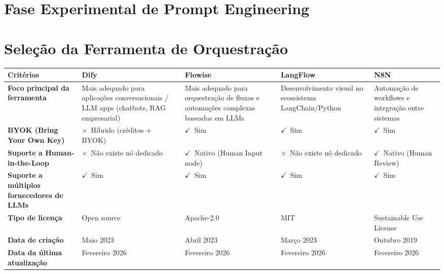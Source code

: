 \section{Fase Experimental de Prompt Engineering}

\section{Seleção da Ferramenta de Orquestração}

\newcommand{\okicon}{\textcolor{green!60!black}{\Large$\checkmark$}}
\newcommand{\warnicon}{\textcolor{red!75!black}{\Large$\times$}}
\newcommand{\staricon}{\textcolor{yellow!80!orange}{\large$\star$}}

\begin{table}[p]
    \centering
    \scriptsize
    \renewcommand{\arraystretch}{1.2}
    \setlength{\tabcolsep}{3pt}
    \begin{tabular}{|p{}|p{}|p{}|p{}|p{}|}
        \rowcolor{gray!20}
        \hline
        \textbf{Critérios} & \textbf{Dify} & \textbf{Flowise} & \textbf{LangFlow} & \textbf{N8N} \\
        \hline
        \rowcolors{2}{gray!10}{white}
        \textbf{Foco principal da ferramenta} & Mais adequado para aplicações conversacionais / LLM apps (chatbots, RAG empresarial) & Mais adequado para orquestração de fluxos e automações complexas baseadas em LLMs & Desenvolvimento visual no ecossistema LangChain/Python & Automação de workflows e integração entre sistemas \\
        \hline
        \textbf{BYOK (Bring Your Own Key)} & \warnicon\ Híbrido (créditos + BYOK) & \okicon\ Sim & \okicon\ Sim & \okicon\ Sim \\
        \hline
        \textbf{Suporte a Human-in-the-Loop} & \warnicon\ Não existe nó dedicado & \okicon\ Nativo (Human Input node) & \warnicon\ Não existe nó dedicado & \okicon\ Nativo (Human Review) \\
        \hline
        \textbf{Suporte a múltiplos fornecedores de LLMs} & \okicon\ Sim & \okicon\ Sim & \okicon\ Sim & \okicon\ Sim \\
        \hline
        \textbf{Tipo de licença} & Open source & Apache-2.0 & MIT & Sustainable Use License \\
        \hline
        \textbf{Data de criação} & Maio 2023 & Abril 2023 & Março 2023 & Outubro 2019 \\
        \hline
        \textbf{Data da última atualização} & Fevereiro 2026 & Fevereiro 2026 & Fevereiro 2026 & Fevereiro 2026 \\

\end{tabular}
\end{table}

